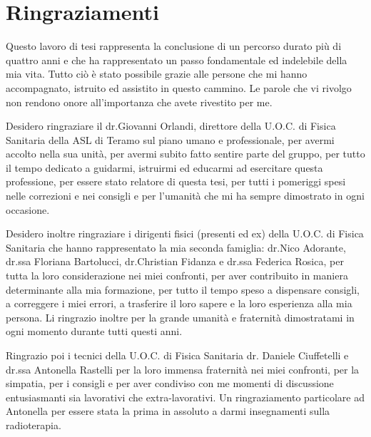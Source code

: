 
\chapter*{Ringraziamenti}
Questo lavoro di tesi rappresenta la conclusione di un percorso durato più di quattro anni e che ha rappresentato un passo fondamentale ed indelebile della mia vita. Tutto ciò è stato possibile grazie alle persone che mi hanno accompagnato, istruito ed assistito in questo cammino. Le parole che vi rivolgo non rendono onore all'importanza che avete rivestito per me.

\vspace*{2ex}

Desidero ringraziare il dr.Giovanni Orlandi, direttore della U.O.C. di Fisica Sanitaria della ASL di Teramo sul piano umano e professionale, per avermi accolto nella sua unità, per avermi subito fatto sentire parte del gruppo, per tutto il tempo dedicato a guidarmi, istruirmi ed educarmi ad esercitare questa professione, per essere stato relatore di questa tesi, per tutti i pomeriggi spesi nelle correzioni e nei consigli e per l'umanità che mi ha sempre dimostrato in ogni occasione.

\vspace*{2ex}

Desidero inoltre ringraziare i dirigenti fisici (presenti ed ex) della U.O.C. di Fisica Sanitaria che hanno rappresentato la mia seconda famiglia: dr.Nico Adorante, dr.ssa Floriana Bartolucci, dr.Christian Fidanza e dr.ssa Federica Rosica, per tutta la loro considerazione nei miei confronti, per aver contribuito in maniera determinante alla mia formazione, per tutto il tempo speso a dispensare consigli, a correggere i miei errori, a trasferire il loro sapere e la loro esperienza alla mia persona. Li ringrazio inoltre per la grande umanità e fraternità dimostratami in ogni momento durante tutti questi anni.

\vspace*{2ex}

Ringrazio poi i tecnici della U.O.C. di Fisica Sanitaria dr. Daniele Ciuffetelli e dr.ssa Antonella Rastelli per la loro immensa fraternità nei miei confronti, per la simpatia, per i consigli e per aver condiviso con me momenti di discussione entusiasmanti sia lavorativi che extra-lavorativi. Un ringraziamento particolare ad Antonella  per essere stata la prima in assoluto a darmi insegnamenti sulla radioterapia.

\vspace*{2ex}

